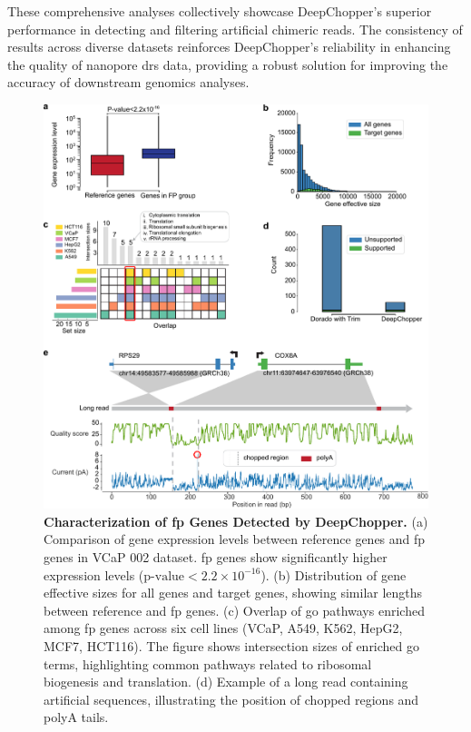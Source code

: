 \documentclass[pdflatex, sn-mathphys-num, lineno]{sn-jnl}%
\theoremstyle{thmstyleone}%
\theoremstyle{thmstyletwo}%
\theoremstyle{thmstylethree}%
\begin{document}
These comprehensive analyses collectively showcase DeepChopper's superior performance in detecting and filtering artificial chimeric reads.
The consistency of results across diverse datasets reinforces DeepChopper's reliability in enhancing the quality of nanopore \gls{drs} data, providing a robust solution for improving the accuracy of downstream genomics analyses.

\begin{figure}[!h]
	\includegraphics[height=1\columnwidth]{finals/figure2}
	\caption{{\bf Characterization of \gls{fp} Genes Detected by DeepChopper.} (a) Comparison of gene expression levels between reference genes and \gls{fp} genes in VCaP 002 dataset. \gls{fp} genes show significantly higher expression levels (\(\textrm{p-value} < 2.2 \times 10^{-16}\)). (b) Distribution of gene effective sizes for all genes and target genes, showing similar lengths between reference and \gls{fp} genes. (c) Overlap of \gls{go} pathways enriched among \gls{fp} genes across six cell lines (VCaP, A549, K562, HepG2, MCF7, HCT116). The figure shows intersection sizes of enriched \gls{go} terms, highlighting common pathways related to ribosomal biogenesis and translation. (d) Example of a long read containing artificial sequences, illustrating the position of chopped regions and polyA tails.}\label{fig:f2}
\end{figure}
\end{document}
